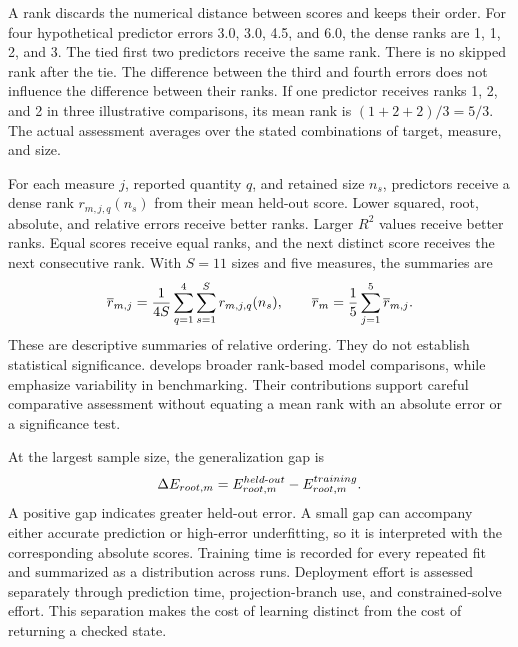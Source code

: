 A rank discards the numerical distance between scores and keeps their order. For four hypothetical predictor errors 3.0, 3.0, 4.5, and 6.0, the dense ranks are 1, 1, 2, and 3. The tied first two predictors receive the same rank. There is no skipped rank after the tie. The difference between the third and fourth errors does not influence the difference between their ranks. If one predictor receives ranks 1, 2, and 2 in three illustrative comparisons, its mean rank is \((1+2+2)/3=5/3\). The actual assessment averages over the stated combinations of target, measure, and size.

For each measure \(j\), reported quantity \(q\), and retained size \(n_s\), predictors receive a dense rank \(r_{m,j,q}(n_s)\) from their mean held-out score. Lower squared, root, absolute, and relative errors receive better ranks. Larger \(R^2\) values receive better ranks. Equal scores receive equal ranks, and the next distinct score receives the next consecutive rank. With \(S=11\) sizes and five measures, the summaries are
\begin{equation}
\equationname{Mean dense ranks over quantities, measures, and sample sizes}
\label{eq:icsor_dense_rank}
\overline r_{m,j}=\frac{1}{4S}\sum_{q=1}^{4}\sum_{s=1}^{S}r_{m,j,q}(n_s),
\qquad
\overline r_m=\frac{1}{5}\sum_{j=1}^{5}\overline r_{m,j}.
\end{equation}
These are descriptive summaries of relative ordering. They do not establish statistical significance. \citet{Demsar2006} develops broader rank-based model comparisons, while \citet{Shevchenko2024} emphasize variability in benchmarking. Their contributions support careful comparative assessment without equating a mean rank with an absolute error or a significance test.

At the largest sample size, the generalization gap is
\begin{equation}
\equationname{Held-out minus training root-error gap}
\label{eq:icsor_generalization_gap}
\Delta E_{root,m}=E_{root,m}^{held\text{-}out}-E_{root,m}^{training}.
\end{equation}
A positive gap indicates greater held-out error. A small gap can accompany either accurate prediction or high-error underfitting, so it is interpreted with the corresponding absolute scores. Training time is recorded for every repeated fit and summarized as a distribution across runs. Deployment effort is assessed separately through prediction time, projection-branch use, and constrained-solve effort. This separation makes the cost of learning distinct from the cost of returning a checked state.

